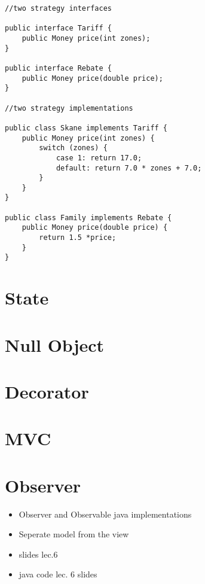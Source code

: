 \documentclass[11pt]{amsart}
\begin{document}
\begin{lstlisting}
//two strategy interfaces

public interface Tariff {
	public Money price(int zones);
}

public interface Rebate {
	public Money price(double price);
}

//two strategy implementations

public class Skane implements Tariff { 
	public Money price(int zones) {
		switch (zones) { 
			case 1: return 17.0; 
			default: return 7.0 * zones + 7.0;
		} 
	}
}

public class Family implements Rebate {
	public Money price(double price) { 
		return 1.5 *price;
	} 
}
\end{lstlisting}

\section{State}

\section{Null Object}

\section{Decorator}

\section{MVC}

\section{Observer}

\begin{itemize}
  \item Observer and Observable java implementations
  \item Seperate model from the view
  \item slides lec.6
  \item java code lec. 6 slides
\end{itemize}
\end{document}
